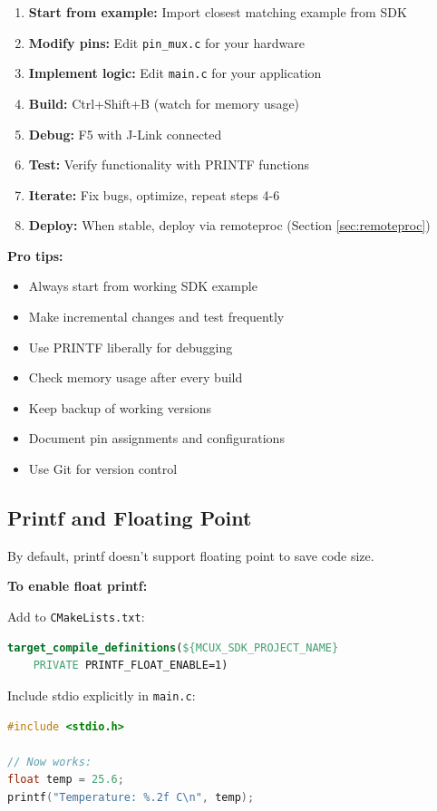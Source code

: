 \documentclass[12pt,a4paper]{report}
\begin{document}
\begin{enumerate}
    \item \textbf{Start from example:} Import closest matching example from SDK
    \item \textbf{Modify pins:} Edit \texttt{pin\_mux.c} for your hardware
    \item \textbf{Implement logic:} Edit \texttt{main.c} for your application
    \item \textbf{Build:} Ctrl+Shift+B (watch for memory usage)
    \item \textbf{Debug:} F5 with J-Link connected
    \item \textbf{Test:} Verify functionality with  PRINTF functions
    \item \textbf{Iterate:} Fix bugs, optimize, repeat steps 4-6
    \item \textbf{Deploy:} When stable, deploy via remoteproc (Section \ref{sec:remoteproc})
\end{enumerate}

\textbf{Pro tips:}
\begin{itemize}
    \item Always start from working SDK example
    \item Make incremental changes and test frequently
    \item Use PRINTF liberally for debugging
    \item Check memory usage after every build
    \item Keep backup of working versions
    \item Document pin assignments and configurations
    \item Use Git for version control
\end{itemize}

\subsection{Printf and Floating Point}

By default, printf doesn't support floating point to save code size.

\textbf{To enable float printf:}

Add to \texttt{CMakeLists.txt}:
\begin{lstlisting}[language=cmake]
target_compile_definitions(${MCUX_SDK_PROJECT_NAME} 
    PRIVATE PRINTF_FLOAT_ENABLE=1)
\end{lstlisting}

Include stdio explicitly in \texttt{main.c}:
\begin{lstlisting}[language=c]
#include <stdio.h>

// Now works:
float temp = 25.6;
printf("Temperature: %.2f C\n", temp);
\end{lstlisting}
\end{document}
